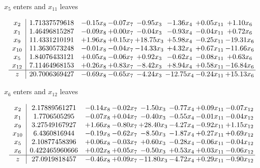 \documentclass[9pt]{article}
\begin{document}
 $ x_{5} $ enters and $ x_{11} $ leaves 

 \[\begin{array}{c| c c@{\hskip 2pt} c@{\hskip 2pt} c@{\hskip 2pt} c@{\hskip 2pt} c@{\hskip 2pt} c@{\hskip 2pt} }
 x_{2}   &  1.71337579618 & -0.15 x_{8} & -0.07 x_{7} & -0.95 x_{3} & -1.36 x_{4} & +  0.05 x_{11} & +  1.10 x_{6}\\
 x_{1}   &  1.46496815287 & -0.09 x_{8} & +  0.00 x_{7} & -0.04 x_{3} & -0.93 x_{4} & -0.04 x_{11} & +  0.72 x_{6}\\
 x_{9}   &  11.4331210191 & +  1.96 x_{8} & +  0.15 x_{7} & + 18.75 x_{3} & +  5.98 x_{4} & -0.25 x_{11} & -19.31 x_{6}\\
 x_{10}   &  11.3630573248 & -0.01 x_{8} & -0.04 x_{7} & -14.33 x_{3} & +  4.32 x_{4} & +  0.67 x_{11} & -11.66 x_{6}\\
 x_{5}   &  1.84076433121 & +  0.05 x_{8} & -0.06 x_{7} & +  0.92 x_{3} & -0.62 x_{4} & -0.08 x_{11} & +  0.63 x_{6}\\
 x_{12}   &  7.11464968153 & +  0.26 x_{8} & +  0.83 x_{7} & -8.42 x_{3} & +  8.94 x_{4} & +  0.58 x_{11} & -16.84 x_{6}\\
\hline
z    &  20.7006369427 & -0.69 x_{8} & -0.65 x_{7} & -4.24 x_{3} & -12.75 x_{4} & -0.24 x_{11} & + 15.13 x_{6}\\
\end{array}\]


 $ x_{6} $ enters and $ x_{12} $ leaves 

 \[\begin{array}{c| c c@{\hskip 2pt} c@{\hskip 2pt} c@{\hskip 2pt} c@{\hskip 2pt} c@{\hskip 2pt} c@{\hskip 2pt} }
 x_{2}   &  2.17889561271 & -0.14 x_{8} & -0.02 x_{7} & -1.50 x_{3} & -0.77 x_{4} & +  0.09 x_{11} & -0.07 x_{12}\\
 x_{1}   &  1.7706505295 & -0.07 x_{8} & +  0.04 x_{7} & -0.40 x_{3} & -0.55 x_{4} & -0.01 x_{11} & -0.04 x_{12}\\
 x_{9}   &  3.27549167927 & +  1.66 x_{8} & -0.80 x_{7} & + 28.40 x_{3} & -4.27 x_{4} & -0.92 x_{11} & +  1.15 x_{12}\\
 x_{10}   &  6.4360816944 & -0.19 x_{8} & -0.62 x_{7} & -8.50 x_{3} & -1.87 x_{4} & +  0.27 x_{11} & +  0.69 x_{12}\\
 x_{5}   &  2.10877458396 & +  0.06 x_{8} & -0.03 x_{7} & +  0.60 x_{3} & -0.28 x_{4} & -0.06 x_{11} & -0.04 x_{12}\\
 x_{6}   &  0.422465960666 & +  0.02 x_{8} & +  0.05 x_{7} & -0.50 x_{3} & +  0.53 x_{4} & +  0.03 x_{11} & -0.06 x_{12}\\
\hline
z    &  27.0919818457 & -0.46 x_{8} & +  0.09 x_{7} & -11.80 x_{3} & -4.72 x_{4} & +  0.29 x_{11} & -0.90 x_{12}\\
\end{array}\]
\end{document}
